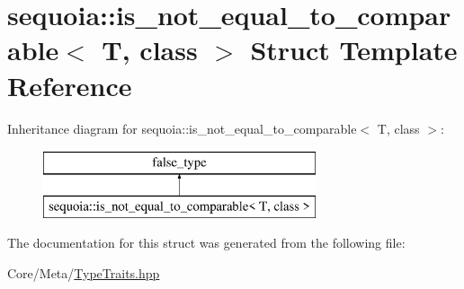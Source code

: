 \hypertarget{structsequoia_1_1is__not__equal__to__comparable}{}\section{sequoia\+::is\+\_\+not\+\_\+equal\+\_\+to\+\_\+comparable$<$ T, class $>$ Struct Template Reference}
\label{structsequoia_1_1is__not__equal__to__comparable}
Inheritance diagram for sequoia\+::is\+\_\+not\+\_\+equal\+\_\+to\+\_\+comparable$<$ T, class $>$\+:\begin{figure}[H]
\begin{center}
\leavevmode
\includegraphics[height=2.000000cm]{structsequoia_1_1is__not__equal__to__comparable}
\end{center}
\end{figure}


The documentation for this struct was generated from the following file\+:\begin{DoxyCompactItemize}
\item 
Core/\+Meta/\mbox{\hyperlink{_type_traits_8hpp}{Type\+Traits.\+hpp}}\end{DoxyCompactItemize}
